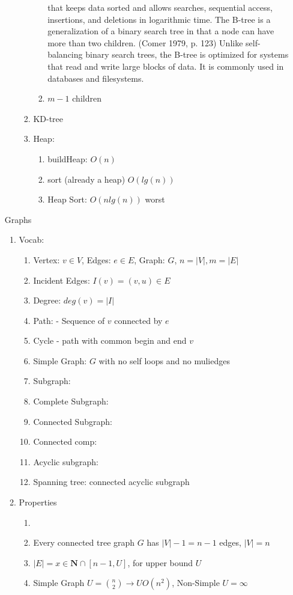 \documentclass[12pt]{article}
\newcommand{\abs}[1]{\left| #1 \right|} %
\renewcommand{\=}[1]{\stackrel{#1}{=}} %
\theoremstyle{definition}
\theoremstyle{remark}
\begin{document}
\begin{enumerate}
\begin{enumerate}
\begin{enumerate}
\begin{enumerate}
          that keeps data sorted and allows searches, sequential
          access, insertions, and deletions in logarithmic time. The
          B-tree is a generalization of a binary search tree in that a
          node can have more than two children. (Comer 1979, p. 123)
          Unlike self-balancing binary search trees, the B-tree is
          optimized for systems that read and write large blocks of
          data. It is commonly used in databases and filesystems.
        \item $m-1$ children
        \end{enumerate}
      \item KD-tree
      \item Heap:
        \begin{enumerate}
        \item buildHeap: $O(n)$
        \item sort (already a heap) $O(lg(n))$
        \item Heap Sort: $O(nlg(n))$ worst
        \end{enumerate}
      \end{enumerate}
    \end{enumerate}
    Graphs
    \begin{enumerate}
    \item Vocab:
      \begin{enumerate}
      \item Vertex: $v\in V$, Edges: $e\in E$, Graph: $G$, $n=
        \abs{V}, m = \abs{E}$
      \item Incident Edges: $I(v) = {(v,u) \in E}$
      \item Degree: $deg(v) = \abs{I}$
      \item Path: - Sequence of $v$ connected by $e$
      \item Cycle - path with common begin and end $v$
      \item Simple Graph: $G$ with no self loops and no muliedges
      \item Subgraph:
      \item Complete Subgraph:
      \item Connected Subgraph:
      \item Connected comp:
      \item Acyclic subgraph:
      \item Spanning tree: connected acyclic subgraph
      \end{enumerate}

    \item Properties
      \begin{enumerate}\item 
      \item Every connected tree graph $G$ has $\abs{V}-1= n-1$ edges,
        $\abs{V} = n$
      \item $\abs{E} = {x\in \mathbf{N}\cap[n-1,U]}$, for upper bound $U$
      \item Simple Graph $U=\binom{n}{2} \rightarrow U O(n^2)$,
        Non-Simple $U=\infty$
      \end{enumerate}


\end{enumerate}
\end{enumerate}
\end{document}
